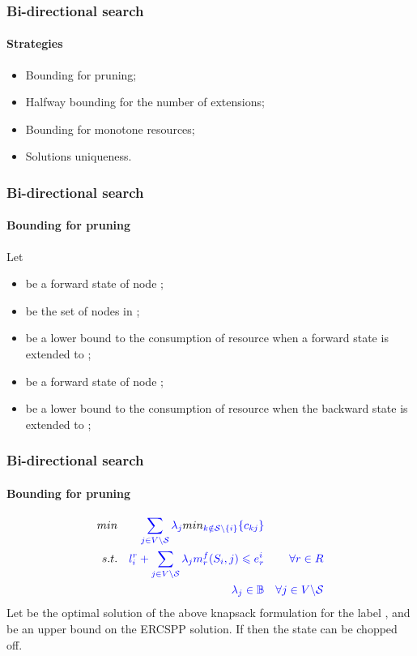 \begin{frame}
  \frametitle{Bi-directional search}
  \framesubtitle{Strategies}
  \begin{itemize}
    \item Bounding for pruning;
    \item Halfway bounding for the number of extensions;
    \item Bounding for monotone resources;
    \item Solutions uniqueness.
  \end{itemize}
\end{frame}

\begin{frame}
  \frametitle{Bi-directional search}
  \framesubtitle{Bounding for pruning}
  Let
  \begin{itemize}
    \item {} be a forward state of node ;
    \item {} be the set of nodes in ;
    \item {} be a lower bound to the consumption of resource  when a forward state  is extended to ;
    \item {} be a forward state of node ;
    \item {} be a lower bound to the consumption of resource  when the backward state  is extended to ;
  \end{itemize}
\end{frame}

\begin{frame}
  \frametitle{Bi-directional search}
  \framesubtitle{Bounding for pruning}
 \begin{align} 
    \textcolor{black}{min}  && \color{blue}\sum_{j \in V \backslash \mathcal{S}} \lambda_j \textcolor{black}{min}_{k \notin \mathcal{S}\backslash \{i\}} \{ c_{kj} \} && \\
    \textcolor{black}{s.t.} && \color{blue}l_i^r + \sum_{j \in V \backslash \mathcal{S}} \lambda_j m^f_r(S_i, j) \leqslant e_r^i && \color{blue}\forall r \in R \\
                            && \color{blue}\lambda_j \in \mathbb{B} && \color{blue}\forall j \in V \backslash \mathcal{S} 
\end{align}
  Let  be the optimal solution of the above knapsack formulation for the label , and  be an upper bound on the ERCSPP solution.
  If  then the state  can be chopped off.
\end{frame}

